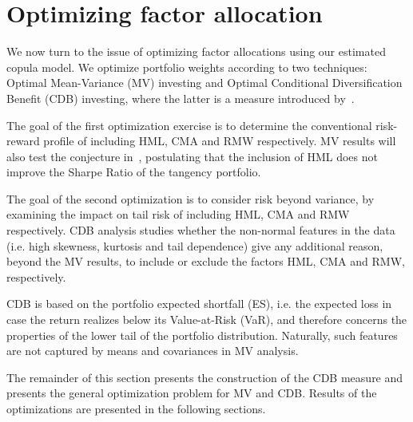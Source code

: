 
\section{Optimizing factor allocation} %
\label{sec:optimizing_factor_allocations}

We now turn to the issue of optimizing factor allocations using our estimated copula model. We optimize portfolio weights according to two techniques: Optimal Mean-Variance (MV) investing and Optimal Conditional Diversification Benefit (CDB) investing, where the latter is a measure introduced by~\textcite{ChristoffersenErrunzaJacobLanglois2012}.

The goal of the first optimization exercise is to determine the conventional risk-reward profile of including HML, CMA and RMW respectively. MV results will also test the conjecture in~\textcite{FF2015}, postulating that the inclusion of HML does not improve the Sharpe Ratio of the tangency portfolio. 

The goal of the second optimization is to consider risk beyond variance, by examining the impact on tail risk of including HML, CMA and RMW respectively. CDB analysis studies whether the non-normal features in the data (i.e. high skewness, kurtosis and tail dependence) give any additional reason, beyond the MV results, to include or exclude the factors HML, CMA and RMW, respectively.

CDB is based on the portfolio expected shortfall (ES), i.e. the expected loss in case the return realizes below its Value-at-Risk (VaR), and therefore concerns the properties of the lower tail of the portfolio distribution. Naturally, such features are not captured by means and covariances in MV analysis.

The remainder of this section presents the construction of the CDB measure and presents the general optimization problem for MV and CDB. Results of the optimizations are presented in the following sections.


